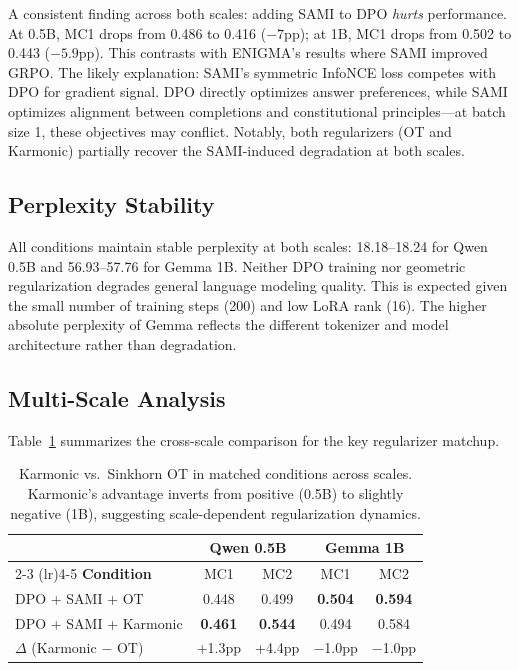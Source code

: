 \documentclass[11pt,a4paper]{article}
\begin{document}
A consistent finding across both scales: adding SAMI to DPO \emph{hurts} performance. At 0.5B, MC1 drops from 0.486 to 0.416 ($-7$pp); at 1B, MC1 drops from 0.502 to 0.443 ($-5.9$pp). This contrasts with ENIGMA's results where SAMI improved GRPO. The likely explanation: SAMI's symmetric InfoNCE loss competes with DPO for gradient signal. DPO directly optimizes answer preferences, while SAMI optimizes alignment between completions and constitutional principles---at batch size 1, these objectives may conflict. Notably, both regularizers (OT and Karmonic) partially recover the SAMI-induced degradation at both scales.

\subsection{Perplexity Stability}

All conditions maintain stable perplexity at both scales: 18.18--18.24 for Qwen 0.5B and 56.93--57.76 for Gemma 1B. Neither DPO training nor geometric regularization degrades general language modeling quality. This is expected given the small number of training steps (200) and low LoRA rank (16). The higher absolute perplexity of Gemma reflects the different tokenizer and model architecture rather than degradation.

\subsection{Multi-Scale Analysis}
\label{sec:scale_dependent}

Table~\ref{tab:scale_comparison} summarizes the cross-scale comparison for the key regularizer matchup.

\begin{table}[h]
\centering
\begin{tabular}{lcccc}
\toprule
& \multicolumn{2}{c}{\textbf{Qwen 0.5B}} & \multicolumn{2}{c}{\textbf{Gemma 1B}} \\
\cmidrule(lr){2-3} \cmidrule(lr){4-5}
\textbf{Condition} & MC1 & MC2 & MC1 & MC2 \\
\midrule
DPO + SAMI + OT & 0.448 & 0.499 & \textbf{0.504} & \textbf{0.594} \\
DPO + SAMI + Karmonic & \textbf{0.461} & \textbf{0.544} & 0.494 & 0.584 \\
\midrule
$\Delta$ (Karmonic $-$ OT) & +1.3pp & +4.4pp & $-$1.0pp & $-$1.0pp \\
\bottomrule
\end{tabular}
\caption{Karmonic vs.\ Sinkhorn OT in matched conditions across scales. Karmonic's advantage inverts from positive (0.5B) to slightly negative (1B), suggesting scale-dependent regularization dynamics.}
\label{tab:scale_comparison}
\end{table}
\end{document}
